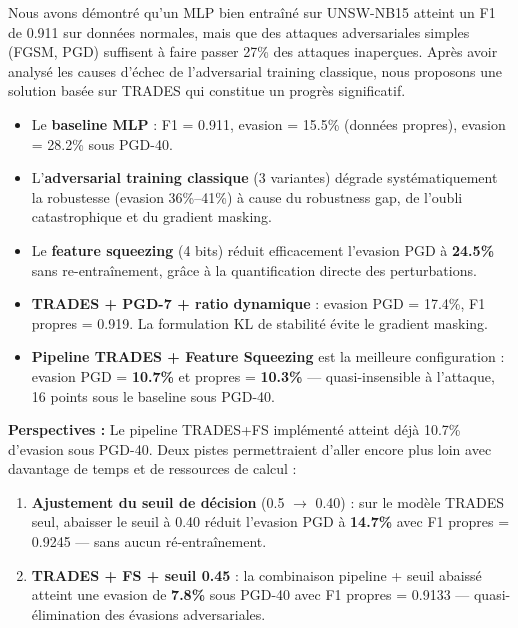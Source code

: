 \documentclass[11pt,a4paper]{article}
\begin{document}
Nous avons d\'emontr\'e qu'un MLP bien entra\^in\'e sur UNSW-NB15 atteint un F1 de 0.911 sur
donn\'ees normales, mais que des attaques adversariales simples (FGSM, PGD) suffisent \`a faire
passer 27\% des attaques inaper\c{c}ues. Apr\`es avoir analys\'e les causes d'\'echec de
l'adversarial training classique, nous proposons une solution bas\'ee sur TRADES qui constitue
un progr\`es significatif.

\begin{itemize}[leftmargin=1.5em, noitemsep]
    \item Le \textbf{baseline MLP} : F1 = 0.911, evasion = 15.5\% (donn\'ees propres),
    evasion = 28.2\% sous PGD-40.
    \item L'\textbf{adversarial training classique} (3 variantes) d\'egrade syst\'ematiquement la robustesse
    (evasion 36\%--41\%) \`a cause du robustness gap, de l'oubli catastrophique et du gradient masking.
    \item Le \textbf{feature squeezing} (4 bits) r\'eduit efficacement l'evasion PGD \`a \textbf{24.5\%}
    sans re-entra\^inement, gr\^ace \`a la quantification directe des perturbations.
    \item \textbf{TRADES + PGD-7 + ratio dynamique} : evasion PGD = 17.4\%, F1 propres = 0.919.
    La formulation KL de stabilit\'e \'evite le gradient masking.
    \item \textbf{Pipeline TRADES + Feature Squeezing} est la meilleure configuration :
    evasion PGD = \textbf{10.7\%} et propres = \textbf{10.3\%} --- quasi-insensible \`a l'attaque,
    16 points sous le baseline sous PGD-40.
\end{itemize}

\textbf{Perspectives :}
Le pipeline TRADES+FS impl\'ement\'e atteint d\'ej\`a 10.7\% d'evasion sous PGD-40.
Deux pistes permettraient d'aller encore plus loin avec davantage de temps et de ressources de calcul :

\begin{enumerate}[leftmargin=1.5em, noitemsep]
    \item \textbf{Ajustement du seuil de d\'ecision} (0.5 $\rightarrow$ 0.40) :
    sur le mod\`ele TRADES seul, abaisser le seuil \`a 0.40 r\'eduit l'evasion PGD \`a
    \textbf{14.7\%} avec F1 propres = 0.9245 --- sans aucun r\'e-entra\^inement.

    \item \textbf{TRADES + FS + seuil 0.45} :
    la combinaison pipeline + seuil abaiss\'e atteint une evasion de \textbf{7.8\%} sous PGD-40
    avec F1 propres = 0.9133 --- quasi-\'elimination des \'evasions adversariales.
\end{enumerate}
\end{document}
